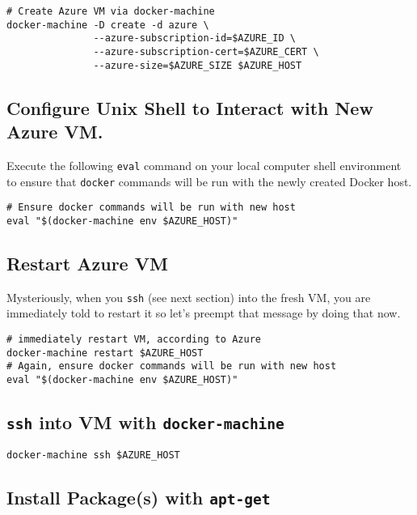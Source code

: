 \documentclass[11pt]{article}
\begin{document}
\begin{verbatim}
# Create Azure VM via docker-machine
docker-machine -D create -d azure \
               --azure-subscription-id=$AZURE_ID \
               --azure-subscription-cert=$AZURE_CERT \
               --azure-size=$AZURE_SIZE $AZURE_HOST
\end{verbatim}

\subsection{Configure Unix Shell to Interact with New Azure VM.}
\label{sec:orgheadline5}

Execute the following \texttt{eval} command on your local computer shell environment to ensure that \texttt{docker} commands will be run with the newly created Docker host.

\begin{verbatim}
# Ensure docker commands will be run with new host
eval "$(docker-machine env $AZURE_HOST)"
\end{verbatim}

\subsection{Restart Azure VM}
\label{sec:orgheadline6}

Mysteriously, when you \texttt{ssh} (see next section) into the fresh VM, you are immediately told to restart it so let's preempt that message by doing that now.

\begin{verbatim}
# immediately restart VM, according to Azure
docker-machine restart $AZURE_HOST
# Again, ensure docker commands will be run with new host
eval "$(docker-machine env $AZURE_HOST)"
\end{verbatim}

\subsection{\texttt{ssh} into VM with \texttt{docker-machine}}
\label{sec:orgheadline7}

\begin{verbatim}
docker-machine ssh $AZURE_HOST
\end{verbatim}


\subsection{Install Package(s) with \texttt{apt-get}}
\label{sec:orgheadline8}
\end{document}
